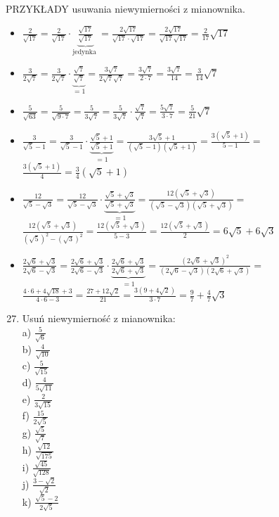 \documentclass[10pt]{article}
\begin{document}
PRZYKŁADY usuwania niewymierności z mianownika.

\begin{itemize}
  \item \(\frac{2}{\sqrt{17}}=\frac{2}{\sqrt{17}} \cdot \underbrace{\frac{\sqrt{17}}{\sqrt{17}}}_{\text {jedynka }}=\frac{2 \sqrt{17}}{\sqrt{17} \cdot \sqrt{17}}=\frac{2 \sqrt{17}}{\sqrt{17} \sqrt{17}}=\frac{2}{17} \sqrt{17}\)
  \item \(\frac{3}{2 \sqrt{7}}=\frac{3}{2 \sqrt{7}} \cdot \underbrace{\frac{\sqrt{7}}{\sqrt{7}}}_{=1}=\frac{3 \sqrt{7}}{2 \sqrt{7} \sqrt{7}}=\frac{3 \sqrt{7}}{2 \cdot 7}=\frac{3 \sqrt{7}}{14}=\frac{3}{14} \sqrt{7}\)
  \item \(\frac{5}{\sqrt{63}}=\frac{5}{\sqrt{9 \cdot 7}}=\frac{5}{3 \sqrt{7}}=\frac{5}{3 \sqrt{7}} \cdot \frac{\sqrt{7}}{\sqrt{7}}=\frac{5 \sqrt{7}}{3 \cdot 7}=\frac{5}{21} \sqrt{7}\)
  \item \(\frac{3}{\sqrt{5}-1}=\frac{3}{\sqrt{5}-1} \cdot \underbrace{\frac{\sqrt{5}+1}{\sqrt{5}+1}}_{=1}=\frac{3 \sqrt{5}+1}{(\sqrt{5}-1)(\sqrt{5}+1)}=\frac{3(\sqrt{5}+1)}{5-1}=\)\\
\(\frac{3(\sqrt{5}+1)}{4}=\frac{3}{4}(\sqrt{5}+1)\)
  \item \(\frac{12}{\sqrt{5}-\sqrt{3}}=\frac{12}{\sqrt{5}-\sqrt{3}} \cdot \underbrace{\frac{\sqrt{5}+\sqrt{3}}{\sqrt{5}+\sqrt{3}}}_{=1}=\frac{12(\sqrt{5}+\sqrt{3})}{(\sqrt{5}-\sqrt{3})(\sqrt{5}+\sqrt{3})}=\)\\
\(\frac{12(\sqrt{5}+\sqrt{3})}{(\sqrt{5})^{2}-(\sqrt{3})^{2}}=\frac{12(\sqrt{5}+\sqrt{3})}{5-3}=\frac{12(\sqrt{5}+\sqrt{3})}{2}=6 \sqrt{5}+6 \sqrt{3}\)
  \item \(\frac{2 \sqrt{6}+\sqrt{3}}{2 \sqrt{6}-\sqrt{3}}=\frac{2 \sqrt{6}+\sqrt{3}}{2 \sqrt{6}-\sqrt{3}} \cdot \underbrace{\frac{2 \sqrt{6}+\sqrt{3}}{2 \sqrt{6}+\sqrt{3}}}_{=1}=\frac{(2 \sqrt{6}+\sqrt{3})^{2}}{(2 \sqrt{6}-\sqrt{3})(2 \sqrt{6}+\sqrt{3})}=\)\\
\(\frac{4 \cdot 6+4 \sqrt{18}+3}{4 \cdot 6-3}=\frac{27+12 \sqrt{2}}{21}=\frac{3(9+4 \sqrt{2})}{3 \cdot 7}=\frac{9}{7}+\frac{4}{7} \sqrt{3}\)
\end{itemize}

\begin{enumerate}
  \setcounter{enumi}{26}
  \item Usuń niewymierność z mianownika:\\
a) \(\frac{5}{\sqrt{6}}\)\\
b) \(\frac{4}{\sqrt{10}}\)\\
c) \(\frac{5}{\sqrt{15}}\)\\
d) \(\frac{4}{5 \sqrt{11}}\)\\
e) \(\frac{2}{3 \sqrt{15}}\)\\
f) \(\frac{15}{2 \sqrt{5}}\)\\
g) \(\frac{\sqrt{5}}{\sqrt{7}}\)\\
h) \(\frac{\sqrt{12}}{\sqrt{175}}\)\\
i) \(\frac{\sqrt{45}}{\sqrt{128}}\)\\
j) \(\frac{3-\sqrt{2}}{\sqrt{2}}\)\\
k) \(\frac{\sqrt{5}-2}{2 \sqrt{5}}\)
\end{enumerate}
\end{document}
